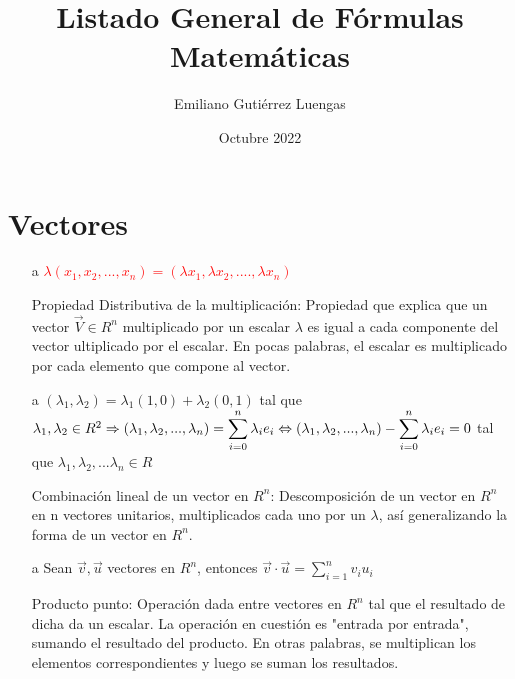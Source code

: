 \documentclass[letterpaper, 12pt]{article}
\title{Listado General de F\'ormulas Matem\'aticas}
\author{Emiliano Gutiérrez Luengas}
\date{Octubre 2022}
\begin{document}
\maketitle

\section{Vectores}
\begin{itemize}
    \item[a] \textcolor{red}{$\lambda(x_1, x_2, ... , x_n) = (\lambda x_1, \lambda x_2, .... , \lambda x_n)$} \newline

    Propiedad Distributiva de la multiplicaci\'on: Propiedad que explica que un vector $\vec V \in R^{n}$ multiplicado por un escalar $\lambda$ es igual a cada componente del vector ultiplicado por el escalar. En pocas palabras, el escalar es multiplicado por cada elemento que compone al vector. \newline

    \item[a] $(\lambda_1, \lambda_2) = \lambda_1(1,0) + \lambda_2(0,1) $ tal que $ \lambda_1, \lambda_2 \in R^2 \newline \Rightarrow (\lambda_1, \lambda_2, ... , \lambda_n) = \displaystyle \sum_{\substack{i=0}}^{n}\lambda_i e_i \Leftrightarrow (\lambda_1, \lambda_2, ... , \lambda_n) - \displaystyle \sum_{\substack{i=0}}^{n}\lambda_i e_i = 0 \newline$ tal que $ \lambda_1, \lambda_2, ... \lambda_n \in R$ \newline

    Combinaci\'on lineal de un vector en $R^{n}$: Descomposici\'on de un vector en $R^{n}$ en n vectores unitarios, multiplicados cada uno por un $\lambda$, as\'i generalizando la forma de un vector en $R^{n}$. \newline

    \item[a] Sean $\vec v, \vec u$ vectores en $R^n$, entonces $\vec v \cdot \vec u = \displaystyle \sum_{i=1}^{n} v_iu_i$ \newline

    Producto punto: Operaci\'on dada entre vectores en $R^{n}$ tal que el resultado de dicha da un escalar. La operaci\'on en cuesti\'on es "entrada por entrada", sumando el resultado del producto. En otras palabras, se multiplican los elementos correspondientes y luego se suman los resultados. \newline
    

\end{itemize}
\end{document}
